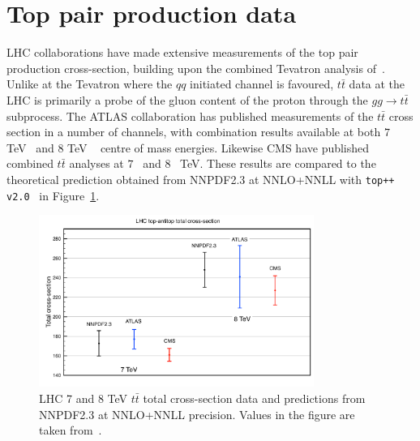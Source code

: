 \section{Top pair production data}
LHC collaborations have made extensive measurements of the top pair production cross-section, building upon the combined Tevatron analysis of~\cite{Aaltonen:2012ttbar}. Unlike at the Tevatron where the $qq$ initiated channel is favoured, $t\bar{t}$ data at the LHC is primarily a probe of the gluon content of the proton through the $gg \to t\bar{t}$ subprocess.
The ATLAS collaboration has published measurements of the $t\bar{t}$ cross section in a number of channels, with combination results available at both $7$ TeV~\cite{ATLAS:2012jyc} and $8$ TeV ~\cite{ATLAS:2012fja} centre of mass energies. Likewise CMS have published combined $t\bar{t}$ analyses at $7$~\cite{Chatrchyan:2012bra} and $8$~\cite{CMS:2012iba} TeV. These results are compared to the theoretical prediction obtained from NNPDF2.3 at NNLO+NNLL with { \tt top++ v2.0}~\cite{Czakon:2011xx} in Figure~\ref{fig:LHCttbar}.

\begin{figure}[!]
\centering
\includegraphics[width=0.8\textwidth]{5-LHCdata/figs/ttbar.pdf}
\caption[LHC 7 and 8 TeV $t\bar{t}$ total cross-section data and predictions from NNPDF2.3]{LHC 7 and 8 TeV $t\bar{t}$ total cross-section data and predictions from NNPDF2.3 at NNLO+NNLL precision. Values in the figure are taken from~\cite{Czakon:2013tha}.}
\label{fig:LHCttbar}
\end{figure}

